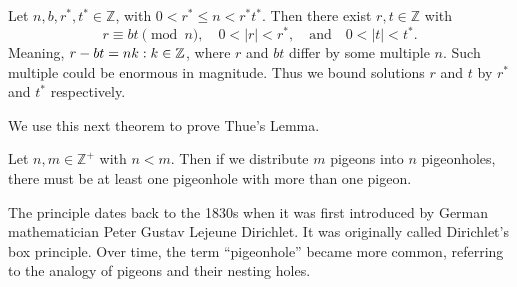 \begin{theo}

    \label{theo:thue}

    Let \( n, b, r^*, t^* \in \mathbb{Z} \), with \( 0 < r^* \leq n < r^*t^* \). Then there exist \( r, t \in \mathbb{Z} \) with
\[
r \equiv bt \pmod{n}, \quad 0<|r| < r^*, \quad \text{and} \quad 0 < |t| < t^*.
\]
\noindent
Meaning, $r-bt=nk:k\in\mathbb{Z}$, where $r$ and $bt$ differ by some multiple $n$. Such multiple could be enormous in magnitude. Thus we bound solutions $r$ and $t$ by $r^*$ and $t^*$ respectively.
\end{theo}
\noindent
We use this next theorem to prove Thue's Lemma.
\begin{theo}

    Let \( n, m \in \mathbb{Z}^+ \) with \( n < m \). Then if we distribute \( m \) pigeons into \( n \) pigeonholes, there must be at least one pigeonhole with more than one pigeon.
\end{theo}
\vspace{1em}
\begin{Tip}
    The principle dates back to the 1830s when it was first introduced by German mathematician Peter Gustav Lejeune Dirichlet. It was originally called Dirichlet's box principle. Over time, the term “pigeonhole” became more common, referring to the analogy of pigeons and their nesting holes.
\end{Tip}

